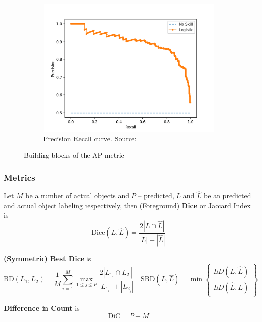 \documentclass{beamer}
\begin{document}
\begin{frame}
\begin{figure}[h]
\begin{subfigure}{0.3\textwidth}
        \end{subfigure}
        \begin{subfigure}{0.3\textwidth}
            \includegraphics[height=0.25\textheight, trim={2cm 0.5cm 4.5cm 4cm},clip]{pr_curve.png}
            \caption{Precision Recall curve. Source: \cite{pr_auc}}
        \end{subfigure}
        \caption{Building blocks of the AP metric}
    \end{figure}

\end{frame}

\begin{frame}
    \frametitle{Metrics}

    Let $M$ be a number of actual objects and $P$ -- predicted,
    $L$ and $\hat{L}$ be an
    predicted and actual object labeling respectively, then
    (Foreground) \textbf{Dice} or Jaccard Index is
    \[
        \text{Dice}(L, \hat{L}) = \frac{2|L \cap \hat{L}|}{|L| + |\hat{L}|}
    \]

    \textbf{(Symmetric) Best Dice} is
    \[
        \text{BD}(L_1, L_2) =
        \frac{1}{M} \sum\limits_{i=1}^{M} \max\limits_{1 \leq j \leq P}
        \frac{2|L_{1_i} \cap L_{2_j}|}{|L_{1_i}| + |L_{2_j}|}
        \quad
        \text{SBD}(L, \hat{L}) =
        \min \left\{ \substack{BD(L, \hat{L}) \\ BD(\hat{L}, L)} \right\}
    \]

    \textbf{Difference in Count} is
    \[
        \text{DiC} = P - M
    \]

\end{frame}
\end{document}
